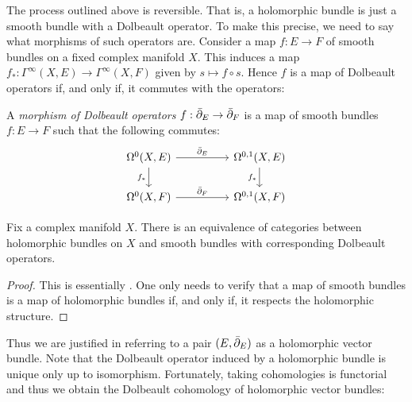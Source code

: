 \documentclass[12pt]{ociamthesis}  %
\begin{document}
The process outlined above is reversible. That is, a holomorphic
bundle is just a smooth bundle with a Dolbeault operator. To make
this precise, we need to say what morphisms of such operators are.
Consider a map $f : E \to F$ of smooth bundles on a fixed complex
manifold $X$. This induces a map
$f_*:\Gamma^\infty(X,E)\to\Gamma^\infty(X,F)$
given by $s \mapsto f\circ s$. Hence $f$ is a map of Dolbeault operators
if, and only if, it commutes with the operators:

\begin{definition}
  A \emph{morphism of Dolbeault operators} $f : \bar{\partial}_E \to \bar{\partial}_F$
  is a map of smooth bundles $f : E\to F$ such that the following commutes:
  \begin{equation*}
    \begin{tikzcd}
      {\Omega^0(X,E)} && {\Omega^{0,1}(X,E)} \\
      {\Omega^0(X,F)} && {\Omega^{0,1}(X,F)}
      \arrow["{\bar\partial_E}", from=1-1, to=1-3]
      \arrow["{f_*}"', from=1-1, to=2-1]
      \arrow["{f_*}"', from=1-3, to=2-3]
      \arrow["{\bar\partial_F}", from=2-1, to=2-3]
    \end{tikzcd}
  \end{equation*}
\end{definition}

\begin{theorem}
  Fix a complex manifold $X$. There is an equivalence of categories
  between holomorphic bundles on $X$ and smooth bundles with corresponding
  Dolbeault operators.
  \begin{proof}
    This is essentially \cite[Theorem 3.2]{moroianu2004}. One only
    needs to verify that a map of smooth bundles is a map of
    holomorphic bundles if, and only if, it respects the holomorphic
    structure. 
  \end{proof}
\end{theorem}

Thus we are justified in referring to a pair $(E,\bar{\partial}_E)$ as a
holomorphic vector bundle.
Note that the Dolbeault operator induced by a holomorphic bundle is
unique only up to isomorphism. Fortunately, taking cohomologies
is functorial and thus we obtain the Dolbeault cohomology of
holomorphic vector bundles:
\end{document}
